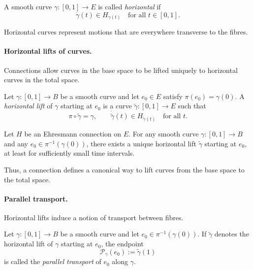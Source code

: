 \begin{gdefn}
A smooth curve $\gamma:[0,1]\to E$ is called \emph{horizontal} if
\[
\dot{\gamma}(t)\in H_{\gamma(t)}
\quad \text{for all } t\in[0,1].
\]
\end{gdefn}

Horizontal curves represent motions that are everywhere transverse to the fibres.

\paragraph{Horizontal lifts of curves.}
Connections allow curves in the base space to be lifted uniquely to horizontal curves
in the total space.

\begin{gdefn}
Let $\gamma:[0,1]\to B$ be a smooth curve and let $e_0\in E$ satisfy
$\pi(e_0)=\gamma(0)$.
A \emph{horizontal lift} of $\gamma$ starting at $e_0$ is a curve
$\widetilde{\gamma}:[0,1]\to E$ such that
\[
\pi\circ \widetilde{\gamma} = \gamma,
\qquad
\dot{\widetilde{\gamma}}(t)\in H_{\widetilde{\gamma}(t)}
\quad \text{for all } t.
\]
\end{gdefn}

\begin{gprop}
Let $H$ be an Ehresmann connection on $E$.
For any smooth curve $\gamma:[0,1]\to B$ and any $e_0\in\pi^{-1}(\gamma(0))$,
there exists a unique horizontal lift $\widetilde{\gamma}$ starting at $e_0$,
at least for sufficiently small time intervals.
\end{gprop}

Thus, a connection defines a canonical way to lift curves from the base space to the
total space.

\paragraph{Parallel transport.}
Horizontal lifts induce a notion of transport between fibres.

\begin{gdefn}
Let $\gamma:[0,1]\to B$ be a smooth curve and let $e_0\in\pi^{-1}(\gamma(0))$.
If $\widetilde{\gamma}$ denotes the horizontal lift of $\gamma$ starting at $e_0$, the
endpoint
\[
\mathcal{P}_{\gamma}(e_0) := \widetilde{\gamma}(1)
\]
is called the \emph{parallel transport} of $e_0$ along $\gamma$.
\end{gdefn}

